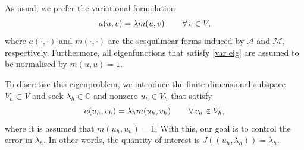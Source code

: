 As usual, we prefer the variational formulation
\begin{equation} \label{var eig}
    a(u, v) = \lambda m(u, v) \qquad \operatorname{\forall} v \in V,
\end{equation}
where $a(\cdot, \cdot)$ and $m(\cdot, \cdot)$ are the sesquilinear forms induced by $\mathcal{A}$ and $\mathcal{M},$ respectively.
Furthermore, all eigenfunctions that satisfy \eqref{var eig} are assumed to be normalised by $m(u, u) = 1.$

To discretise this eigenproblem, we introduce the finite-dimensional subspace \mbox{$V_h \subset V$} and seek $\lambda_h \in \mathbb{C}$ and nonzero $u_h \in V_h$ that satisfy
\begin{equation} \label{gal eig}
    a(u_h, v_h) = \lambda_h m(u_h, v_h) \qquad \operatorname{\forall} v_h \in V_h,
\end{equation}
where it is assumed that $m(u_h, u_h) = 1.$
With this, our goal is to control the error in $\lambda_h$. In other words, the quantity of interest is $J\left((u_h, \lambda_h)\right) = \lambda_h.$


